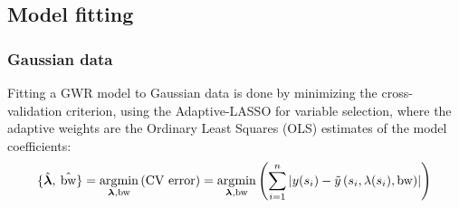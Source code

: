 \documentclass[10pt]{amsart}
\DeclareMathOperator*{\argmin}{\arg\!\min}
\DeclareMathOperator*{\bw}{\mbox{bw}}
\newcommand{\vect}[1]{\boldsymbol{#1}}
\begin{document}
		
	\subsection{Model fitting}
		\subsubsection{Gaussian data}
		Fitting a GWR model to Gaussian data is done by minimizing the cross-validation criterion, using the Adaptive-LASSO for variable selection, where the adaptive weights are the Ordinary Least Squares (OLS) estimates of the model coefficients:
		 \[
			\{ \hat{\vect{\lambda}}, \: \hat{\bw} \} = \argmin_{\vect{\lambda}, \text{bw}} \left( \mbox{CV error} \right)  = \argmin_{\vect{\lambda}, \text{bw}} \left( \sum_{i = 1}^n \left| y(s_i)-\tilde{y}\left(s_i, \lambda(s_i), \bw \right) \right| \right)\\
		\]
		
\end{document}
